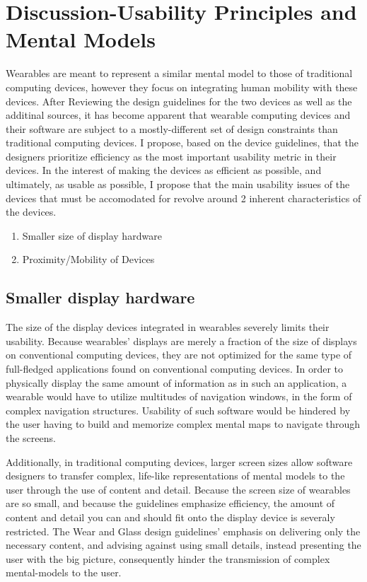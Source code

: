 \documentclass[12pt]{article}
\begin{document}
\section{Discussion-Usability Principles and Mental Models}
Wearables are meant to represent a similar mental model to those of traditional computing devices, however they focus on integrating human mobility with these devices. After Reviewing the design guidelines for the two devices as well as the additinal sources, it has become apparent that wearable computing devices and their software are subject to a mostly-different set of design constraints than traditional computing devices. I  propose, based on the device guidelines, that the designers prioritize efficiency as the most important usability metric in their devices. In the interest of making the devices as efficient as possible, and ultimately, as usable as possible, I propose that the main usability issues of the devices that must be accomodated for revolve around 2 inherent characteristics of the devices.

\begin{enumerate}
\item{Smaller size of display hardware}
\item{Proximity/Mobility of Devices}
\end{enumerate}

\subsection{Smaller display hardware}
The size of the display devices integrated in wearables severely limits their usability. Because wearables' displays are merely a fraction of the size of displays on conventional computing devices, they are not optimized for the same type of full-fledged applications found on conventional computing devices. In order to physically display the same amount of information as in such an application, a wearable would have to utilize multitudes of navigation windows, in the form of complex navigation structures. Usability of such software would be hindered by the user having to build and memorize complex mental maps to navigate through the screens.

Additionally, in traditional computing devices, larger screen sizes allow software designers to transfer complex, life-like representations of mental models to the user through the use of content and detail. Because the screen size of wearables are so small, and because the guidelines emphasize efficiency, the amount of content and detail you can and should fit onto the display device is severaly restricted. The Wear and Glass design guidelines' emphasis on delivering only the necessary content, and advising against using small details, instead presenting the user with the big picture, consequently hinder the transmission of complex mental-models to the user.
\end{document}
